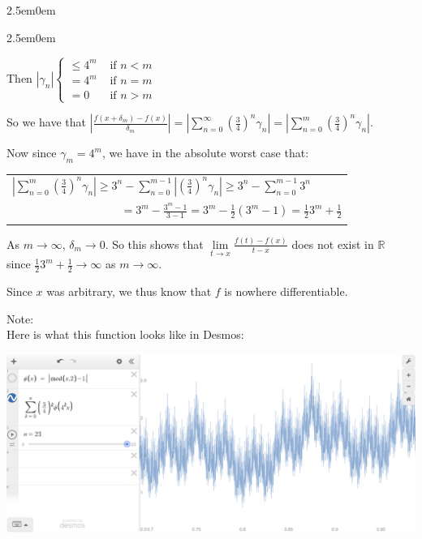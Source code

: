 \documentclass{book}
\newcommand{\hFour}{%
   \color{Cerulean}
   \fontsize{12}{14}\selectfont%
}
\newenvironment{myIndent}{%
   \begin{adjustwidth}{2.5em}{0em}%
}{%
   \end{adjustwidth}%
}
\newcommand{\retTwo}{\hfill\bigbreak}
\begin{document}
\begin{myIndent}
{\begin{myIndent}
      Then $|\gamma_n| \left\{
      \begin{matrix}
         \leq 4^m & \text { if } n < m \\
         = 4^m & \text{ if } n = m \\
         = 0^{\phantom{m}} & \text { if } n > m
      \end{matrix}\right.$\retTwo

      So we have that $\left|\frac{f(x + \delta_m) - f(x)}{\delta_m}\right| = \left|\sum\limits_{n=0}^\infty\left(\frac{3}{4}\right)^n \gamma_n\right| = \left|\sum\limits_{n=0}^m \left(\frac{3}{4}\right)^n \gamma_n\right|$.\retTwo

      Now since $\gamma_m = 4^m$, we have in the absolute worst case that:
      
      {\centering 
      \begin{tabular}{l}
         $\left|\sum\limits_{n=0}^m \left(\frac{3}{4}\right)^n \gamma_n\right| \geq 3^n - \sum\limits_{n=0}^{m-1}\left|\left(\frac{3}{4}\right)^n \gamma_n\right| \geq 3^n - \sum\limits_{n=0}^{m-1} 3^n$\\

         $\phantom{\left|\sum\limits_{n=0}^m \left(\frac{3}{4}\right)^n \gamma_n\right| aaaa} = 3^m - \frac{3^m - 1}{3 - 1} = 3^m - \frac{1}{2}\left(3^m - 1\right) = \frac{1}{2} 3^m + \frac{1}{2}$
      \end{tabular} \retTwo\par}

      As $m \rightarrow \infty$, $\delta_m \rightarrow 0$. So this shows that $\lim\limits_{t\rightarrow x}\frac{f(t) - f(x)}{t - x}$ does not exist in $\mathbb{R}$\\ [-5pt] since $\frac{1}{2}3^m + \frac{1}{2} \rightarrow \infty$ as $m \rightarrow \infty$.\retTwo

      Since $x$ was arbitrary, we thus know that $f$ is nowhere differentiable.

      \newpage

      \hFour

      Note:\\
      Here is what this function looks like in Desmos:\\

      \begin{center}
         \includegraphics[scale=0.4]{Desmos_how_to.png}\retTwo
      \end{center}


\end{myIndent}}
\end{myIndent}
\end{document}
